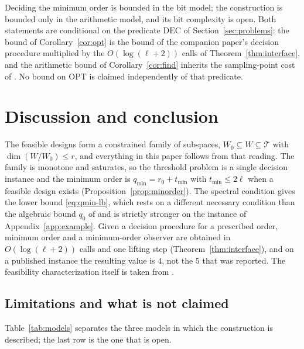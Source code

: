 ﻿\documentclass[journal]{IEEEtran}
\theoremstyle{plainn}
\theoremstyle{remark}
\begin{document}
Deciding the minimum order is bounded in the bit model; the construction is bounded only in the
arithmetic model, and its bit complexity is open. Both statements are conditional on the predicate
$\mathrm{DEC}$ of Section~\ref{sec:problems}: the bound of Corollary~\ref{cor:opt} is the bound of the
companion paper's decision procedure multiplied by the $O(\log(\ell+2))$ calls of
Theorem~\ref{thm:interface}, and the arithmetic bound of Corollary~\ref{cor:find} inherits the
sampling-point cost of \cite{bpr06}. No bound on $\mathrm{OPT}$ is claimed independently of that
predicate.

\section{Discussion and conclusion}\label{sec:conclusions}

The feasible designs form a constrained family of subspaces, $W_0\subseteq W\subseteq\mathcal T$ with
$\dim(W/W_0)\le r$, and everything in this paper follows from that reading. The family is monotone and
saturates, so the threshold problem is a single decision instance and the minimum order is
$q_{\min}=r_0+t_{\min}$ with $t_{\min}\le2\ell$ when a feasible design exists
(Proposition~\ref{prop:minorder}). The spectral
condition gives the lower bound \eqref{eq:qmin-lb}, which rests on a different necessary condition than
the algebraic bound $q_0$ of \cite{fer26a,fer26b} and is strictly stronger on the instance of
Appendix~\ref{app:example}. Given a decision procedure for a prescribed order, minimum order and a
minimum-order observer are obtained in $O(\log(\ell+2))$ calls and one lifting step
(Theorem~\ref{thm:interface}), and on a published instance the resulting value is $4$, not the $5$ that
was reported. The feasibility characterization itself is taken from
\cite{fer10,dar25,fer26a,fer26b}.

\subsection{Limitations and what is not claimed}\label{sec:limits}

Table~\ref{tab:models} separates the three models in which the construction is described; the last
row is the one that is open.
\end{document}
